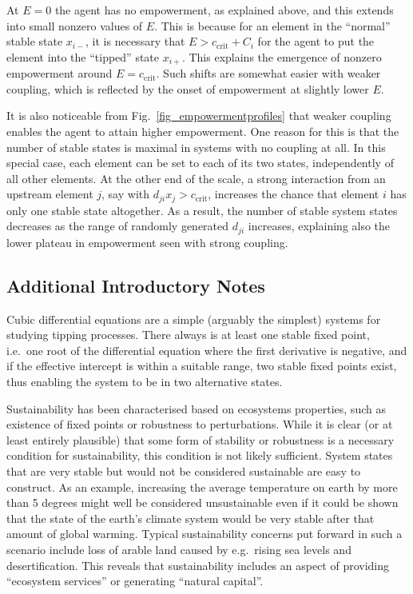\documentclass[conference]{IEEEtran}
\newcommand{\ccrit}{\ensuremath{c_{\mathrm{crit}}}}
\newcommand{\couplingconstant}{\ensuremath{d}}
\newcommand{\couplingfunction}{\ensuremath{C}}
\newcommand{\impactstrength}{\ensuremath{E}}
\begin{document}
At $\impactstrength = 0$ the agent has no empowerment, as explained above, and this
extends into small nonzero values of $\impactstrength$. This is because for an
element in the ``normal'' stable state $x_{i-}$, it is necessary that
$\impactstrength > \ccrit + \couplingfunction_i$ for the agent to put the element
into the ``tipped'' state $x_{i+}$. This explains the emergence of
nonzero empowerment around $\impactstrength = \ccrit$. Such shifts are somewhat
easier with weaker coupling, which is reflected by the onset of
empowerment at slightly lower $\impactstrength$.

It is also noticeable from Fig.~\ref{fig_empowermentprofiles} that
weaker coupling enables the agent to attain higher empowerment. One
reason for this is that the number of stable states is maximal in
systems with no coupling at all. In this special case, each element
can be set to each of its two states, independently of all other
elements. At the other end of the scale, a strong interaction from an
upstream element $j$, say with $\couplingconstant_{ji} x_j > \ccrit$, increases the
chance that element $i$ has only one stable state altogether. As a
result, the number of stable system states decreases as the range of
randomly generated $\couplingconstant_{ji}$ increases, explaining also the lower
plateau in empowerment seen with strong coupling.


\subsection{Additional Introductory Notes}

Cubic differential equations are a simple (arguably the simplest)
systems for studying tipping processes. There always is at least one
stable fixed point, i.e.\ one root of the differential equation where
the first derivative is negative, and if the effective intercept is
within a suitable range, two stable fixed points exist, thus enabling
the system to be in two alternative states.

Sustainability has been characterised based on ecosystems properties,
such as existence of fixed points or robustness to perturbations.
While it is clear (or at least entirely plausible) that some form of
stability or robustness is a necessary condition for sustainability,
this condition is not likely sufficient. System states that are very
stable but would not be considered sustainable are easy to construct.
As an example, increasing the average temperature on earth by more
than 5 degrees might well be considered unsustainable even if it could
be shown that the state of the earth's climate system would be very
stable after that amount of global warming. Typical sustainability
concerns put forward in such a scenario include loss of arable land
caused by e.g.\ rising sea levels and desertification. This reveals
that sustainability includes an aspect of providing ``ecosystem
services'' or generating ``natural capital''.
\end{document}
